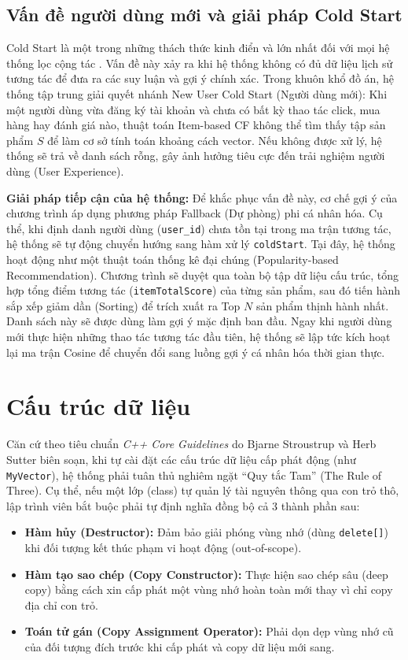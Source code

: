 \documentclass{report}
\begin{document}
\subsection{Vấn đề người dùng mới và giải pháp Cold Start}

Cold Start là một trong những thách thức kinh điển và lớn nhất đối với mọi hệ thống lọc cộng tác \cite{schein2002methods}. Vấn đề này xảy ra khi hệ thống không có đủ dữ liệu lịch sử tương tác để đưa ra các suy luận và gợi ý chính xác. Trong khuôn khổ đồ án, hệ thống tập trung giải quyết nhánh New User Cold Start (Người dùng mới): Khi một người dùng vừa đăng ký tài khoản và chưa có bất kỳ thao tác click, mua hàng hay đánh giá nào, thuật toán Item-based CF không thể tìm thấy tập sản phẩm $S$ để làm cơ sở tính toán khoảng cách vector. Nếu không được xử lý, hệ thống sẽ trả về danh sách rỗng, gây ảnh hưởng tiêu cực đến trải nghiệm người dùng (User Experience).

\textbf{Giải pháp tiếp cận của hệ thống:} Để khắc phục vấn đề này, cơ chế gợi ý của chương trình áp dụng phương pháp Fallback (Dự phòng) phi cá nhân hóa. Cụ thể, khi định danh người dùng (\texttt{user\_id}) chưa tồn tại trong ma trận tương tác, hệ thống sẽ tự động chuyển hướng sang hàm xử lý \texttt{coldStart}. Tại đây, hệ thống hoạt động như một thuật toán thống kê đại chúng (Popularity-based Recommendation). Chương trình sẽ duyệt qua toàn bộ tập dữ liệu cấu trúc, tổng hợp tổng điểm tương tác (\texttt{itemTotalScore}) của từng sản phẩm, sau đó tiến hành sắp xếp giảm dần (Sorting) để trích xuất ra Top $N$ sản phẩm thịnh hành nhất. Danh sách này sẽ được dùng làm gợi ý mặc định ban đầu. Ngay khi người dùng mới thực hiện những thao tác tương tác đầu tiên, hệ thống sẽ lập tức kích hoạt lại ma trận Cosine để chuyển đổi sang luồng gợi ý cá nhân hóa thời gian thực.

\section{Cấu trúc dữ liệu}

Căn cứ theo tiêu chuẩn \textit{C++ Core Guidelines} do Bjarne Stroustrup và Herb Sutter biên soạn, khi tự cài đặt các cấu trúc dữ liệu cấp phát động (như \texttt{MyVector}), hệ thống phải tuân thủ nghiêm ngặt ``Quy tắc Tam'' (The Rule of Three). Cụ thể, nếu một lớp (class) tự quản lý tài nguyên thông qua con trỏ thô, lập trình viên bắt buộc phải tự định nghĩa đồng bộ cả 3 thành phần sau:
\begin{itemize}
    \item \textbf{Hàm hủy (Destructor):} Đảm bảo giải phóng vùng nhớ (dùng \texttt{delete[]}) khi đối tượng kết thúc phạm vi hoạt động (out-of-scope).
    \item \textbf{Hàm tạo sao chép (Copy Constructor):} Thực hiện sao chép sâu (deep copy) bằng cách xin cấp phát một vùng nhớ hoàn toàn mới thay vì chỉ copy địa chỉ con trỏ.
    \item \textbf{Toán tử gán (Copy Assignment Operator):} Phải dọn dẹp vùng nhớ cũ của đối tượng đích trước khi cấp phát và copy dữ liệu mới sang.
\end{itemize}
\end{document}
